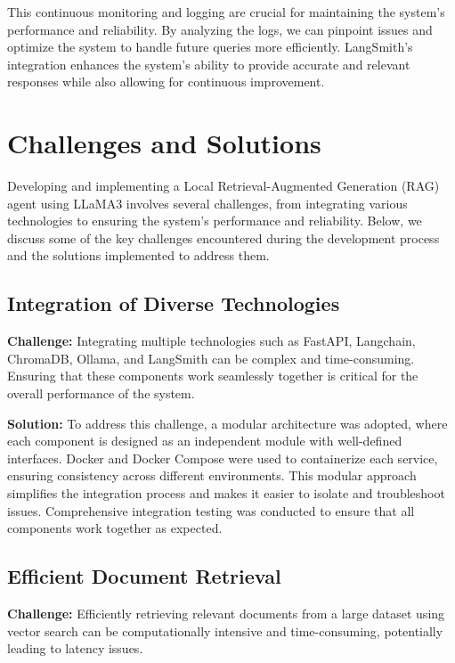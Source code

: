 This continuous monitoring and logging are crucial for maintaining the system's performance and reliability. By analyzing the logs, we can pinpoint issues and optimize the system to handle future queries more efficiently. LangSmith's integration enhances the system's ability to provide accurate and relevant responses while also allowing for continuous improvement.

\section{Challenges and Solutions}

Developing and implementing a Local Retrieval-Augmented Generation (RAG) agent using LLaMA3 involves several challenges, from integrating various technologies to ensuring the system's performance and reliability. Below, we discuss some of the key challenges encountered during the development process and the solutions implemented to address them.

\subsection{Integration of Diverse Technologies}

\textbf{Challenge:} Integrating multiple technologies such as FastAPI, Langchain, ChromaDB, Ollama, and LangSmith can be complex and time-consuming. Ensuring that these components work seamlessly together is critical for the overall performance of the system.

\textbf{Solution:} To address this challenge, a modular architecture was adopted, where each component is designed as an independent module with well-defined interfaces. Docker and Docker Compose were used to containerize each service, ensuring consistency across different environments. This modular approach simplifies the integration process and makes it easier to isolate and troubleshoot issues. Comprehensive integration testing was conducted to ensure that all components work together as expected.

\subsection{Efficient Document Retrieval}

\textbf{Challenge:} Efficiently retrieving relevant documents from a large dataset using vector search can be computationally intensive and time-consuming, potentially leading to latency issues.

